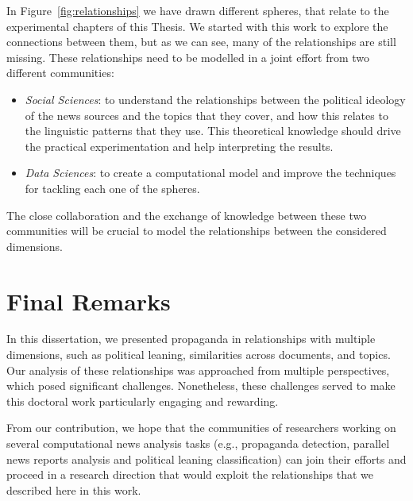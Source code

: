 In Figure~\ref{fig:relationships} we have drawn different spheres, that relate to the experimental chapters of this Thesis. We started with this work to explore the connections between them, but as we can see, many of the relationships are still missing. These relationships need to be modelled in a joint effort from two different communities:

\begin{itemize}
    \item \emph{Social Sciences}: to understand the relationships between the political ideology of the news sources and the topics that they cover, and how this relates to the linguistic patterns that they use. This theoretical knowledge should drive the practical experimentation and help interpreting the results.
    \item \emph{Data Sciences}: to create a computational model and improve the techniques for tackling each one of the spheres.
\end{itemize}
The close collaboration and the exchange of knowledge between these two communities will be crucial to model the relationships between the considered dimensions.





\section{\statusgreen Final Remarks}
\label{sec:discussion_conclusions}

In this dissertation, we presented propaganda in relationships with multiple dimensions, such as political leaning, similarities across documents, and topics. Our analysis of these relationships was approached from multiple perspectives, which posed significant challenges. Nonetheless, these challenges served to make this doctoral work particularly engaging and rewarding.

From our contribution, we hope that the communities of researchers working on several computational news analysis tasks (e.g., propaganda detection, parallel news reports analysis and political leaning classification) can join their efforts and proceed in a research direction that would exploit the relationships that we described here in this work.

